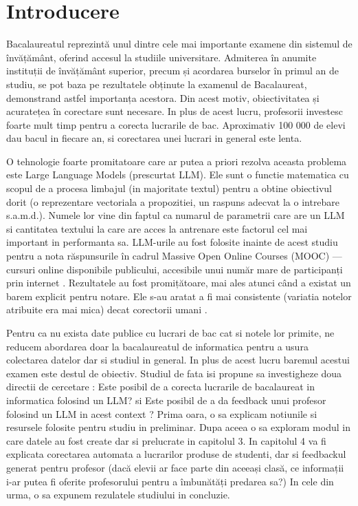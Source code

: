 \chapter{Introducere}
Bacalaureatul reprezintă unul dintre cele mai importante examene din sistemul de învățământ, oferind accesul la studiile universitare.
Admiterea în anumite instituții de învățământ superior, precum și acordarea burselor în primul an de studiu, se pot baza pe rezultatele obținute la examenul de Bacalaureat, demonstrand astfel importanța acestora. 
Din acest motiv, obiectivitatea și acuratețea în corectare sunt necesare.
In plus de acest lucru, profesorii investesc foarte mult timp pentru a corecta lucrarile de bac. Aproximativ 100 000 de elevi dau bacul in fiecare an, si corectarea unei lucrari in general este lenta.

O tehnologie foarte promitatoare care ar putea a priori rezolva aceasta problema este Large Language Models (prescurtat LLM). Ele sunt o functie matematica cu scopul de a procesa limbajul (in majoritate textul)
pentru a obtine obiectivul dorit (o reprezentare vectoriala a propozitiei, un raspuns adecvat la o intrebare s.a.m.d.). Numele lor vine din faptul ca numarul de parametrii care are un LLM si cantitatea textului la care are acces la antrenare este factorul cel mai important in performanta sa.
LLM-urile au fost folosite inainte de acest studiu pentru  a nota răspunsurile în cadrul Massive Open Online Courses (MOOC) — cursuri online disponibile publicului, accesibile unui număr mare de participanți prin internet \cite{golchin}. Rezultatele au fost promițătoare, mai ales atunci când a existat un barem explicit pentru notare. 
Ele s-au aratat a fi mai consistente (variatia notelor atribuite era mai mica) decat corectorii umani \cite{golchin}.

Pentru ca nu exista date publice cu lucrari de bac cat si notele lor primite, ne reducem abordarea doar la bacalaureatul de informatica pentru a usura colectarea datelor dar si studiul in general.
In plus de acest lucru baremul acestui examen este destul de obiectiv.
Studiul de fata isi propune sa investigheze doua directii de cercetare : Este posibil de a corecta lucrarile de bacalaureat in informatica folosind un LLM? si Este posibil de a da feedback unui profesor folosind un LLM in acest context ?
Prima oara, o sa explicam notiunile si resursele folosite pentru studiu in preliminar. Dupa aceea o sa exploram modul in care datele au fost create dar si prelucrate in capitolul 3. 
In capitolul 4 va fi explicata corectarea automata a lucrarilor produse de studenti, dar si feedbackul generat pentru profesor 
(dacă elevii ar face parte din aceeași clasă, ce informații i-ar putea fi oferite profesorului pentru a îmbunătăți predarea sa?)
In cele din urma, o sa expunem rezulatele studiului in concluzie.